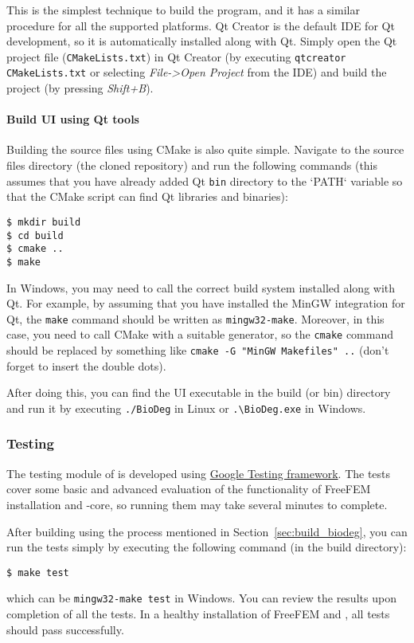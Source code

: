 This is the simplest technique to build the program, and it has a similar procedure for all the supported platforms. Qt Creator is the default IDE for Qt development, so it is automatically installed along with Qt. Simply open the Qt project file (\verb|CMakeLists.txt|) in Qt Creator (by executing \verb|qtcreator CMakeLists.txt| or selecting \textit{File->Open Project} from the IDE) and build the project (by pressing \textit{Shift+B}).

\paragraph{Build \biodeg{} UI using Qt tools}

Building the source files using CMake is also quite simple. Navigate to the source files directory (the cloned repository) and run the following commands (this assumes that you have already added Qt \verb|bin| directory to the `PATH` variable so that the CMake script can find Qt libraries and binaries):

\begin{verbatim}
$ mkdir build
$ cd build
$ cmake ..
$ make
\end{verbatim}

In Windows, you may need to call the correct build system installed along with Qt. For example, by assuming that you have installed the MinGW integration for Qt, the \verb|make| command should be written as \verb|mingw32-make|. Moreover, in this case, you need to call CMake with a suitable generator, so the \verb|cmake| command should be replaced by something like \verb|cmake -G "MinGW Makefiles" ..| (don't forget to insert the double dots).

After doing this, you can find the \biodeg{} UI executable in the build (or bin) directory and run it by executing \verb|./BioDeg| in Linux or \verb|.\BioDeg.exe| in Windows.

\subsubsection{Testing \biodeg{}}

The testing module of \biodeg{} is developed using \href{https://github.com/google/googletest}{Google Testing framework}. The tests cover some basic and advanced evaluation of the functionality of FreeFEM installation and \biodeg{}-core, so running them may take several minutes to complete. 

After building \biodeg{} using the process mentioned in Section~\ref{sec:build_biodeg}, you can run the tests simply by executing the following command (in the build directory):

\begin{verbatim}
$ make test
\end{verbatim}
which can be \verb|mingw32-make test| in Windows. You can review the results upon completion of all the tests. In a healthy installation of FreeFEM and \biodeg{}, all tests should pass successfully. 